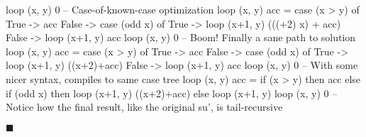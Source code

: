 \begin{spec}
loop (x, y) 0
-- Case-of-known-case optimization
loop (x, y) acc = case (x > y) of
  True -> acc
  False -> case (odd x) of
    True -> loop (x+1, y) (((+2) x) + acc)
    False -> loop (x+1, y) acc
loop (x, y) 0
-- Boom! Finally a sane path to solution
loop (x, y) acc = case (x > y) of
  True -> acc
  False -> case (odd x) of
    True -> loop (x+1, y) ((x+2)+acc)
    False -> loop (x+1, y) acc
loop (x, y) 0
-- With some nicer syntax, compiles to same case tree
loop (x, y) acc = if (x > y)
                  then acc
                  else if (odd x)
                       then loop (x+1, y) ((x+2)+acc)
                       else loop (x+1, y)
loop (x, y) 0
-- Notice how the final result, like the original su', is tail-recursive
\end{spec}
$\blacksquare$